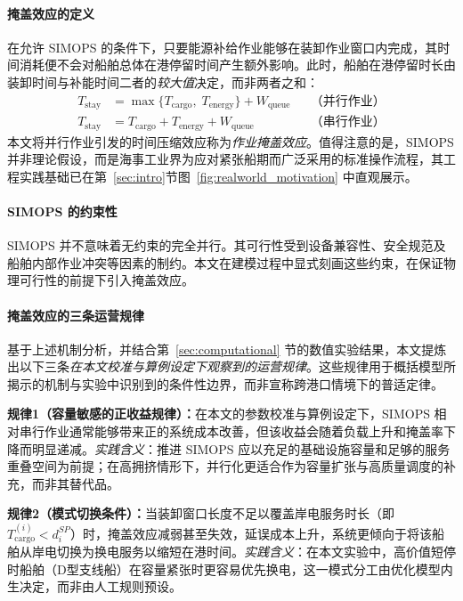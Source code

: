 \documentclass[UTF8, a4paper, 12pt]{ctexart}
\theoremstyle{plain}
\theoremstyle{definition}
\theoremstyle{remark}
\begin{document}
\paragraph{掩盖效应的定义}
在允许 SIMOPS 的条件下，只要能源补给作业能够在装卸作业窗口内完成，其时间消耗便不会对船舶总体在港停留时间产生额外影响。此时，船舶在港停留时长由装卸时间与补能时间二者的\emph{较大值}决定，而非两者之和：
\begin{equation*}
\begin{aligned}
T_{\text{stay}} &= \max\{T_{\text{cargo}},\; T_{\text{energy}}\} + W_{\text{queue}}
&& \text{（并行作业）} \\
T_{\text{stay}} &= T_{\text{cargo}} + T_{\text{energy}} + W_{\text{queue}}
&& \text{（串行作业）}
\end{aligned}
\end{equation*}
本文将并行作业引发的时间压缩效应称为\emph{作业掩盖效应}。值得注意的是，SIMOPS 并非理论假设，而是海事工业界为应对紧张船期而广泛采用的标准操作流程，其工程实践基础已在第~\ref{sec:intro}节图~\ref{fig:realworld_motivation} 中直观展示。
 
\paragraph{SIMOPS 的约束性}
SIMOPS 并不意味着无约束的完全并行。其可行性受到设备兼容性、安全规范及船舶内部作业冲突等因素的制约。本文在建模过程中显式刻画这些约束，在保证物理可行性的前提下引入掩盖效应。

\paragraph{掩盖效应的三条运营规律}
基于上述机制分析，并结合第~\ref{sec:computational} 节的数值实验结果，本文提炼出以下三条\emph{在本文校准与算例设定下观察到的运营规律}。这些规律用于概括模型所揭示的机制与实验中识别到的条件性边界，而非宣称跨港口情境下的普适定律。

\textbf{规律1（容量敏感的正收益规律）：}在本文的参数校准与算例设定下，SIMOPS 相对串行作业通常能够带来正的系统成本改善，但该收益会随着负载上升和掩盖率下降而明显递减。\emph{实践含义}：推进 SIMOPS 应以充足的基础设施容量和足够的服务重叠空间为前提；在高拥挤情形下，并行化更适合作为容量扩张与高质量调度的补充，而非其替代品。

\textbf{规律2（模式切换条件）：}当装卸窗口长度不足以覆盖岸电服务时长（即 $T^{(i)}_{\text{cargo}} < d_i^{SP}$）时，掩盖效应减弱甚至失效，延误成本上升，系统更倾向于将该船舶从岸电切换为换电服务以缩短在港时间。\emph{实践含义}：在本文实验中，高价值短停时船舶（D型支线船）在容量紧张时更容易优先换电，这一模式分工由优化模型内生决定，而非由人工规则预设。
\end{document}
